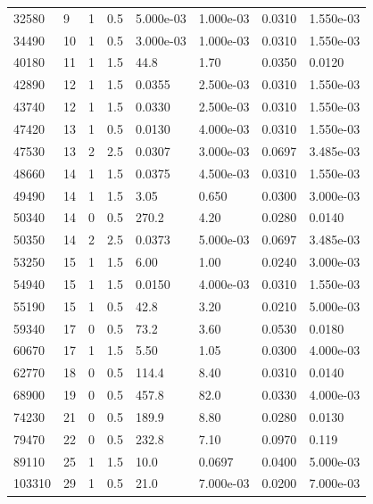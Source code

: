 \documentclass[preview]{standalone}
\begin{document}
{{\begin{tabular}{L{1.2cm}C{1.2cm} C{0.3cm}C{0.5cm} C{1.4cm}C{1.4cm} C{1.4cm}C{1.4cm}}
  32580  &     9  & 1     & 0.5 &  5.000e-03  & 1.000e-03  & 0.0310 &  1.550e-03   \\ 
  34490  &    10  & 1     & 0.5 &  3.000e-03  & 1.000e-03  & 0.0310 &  1.550e-03   \\ 
  40180  &    11  & 1     & 1.5 &  44.8  & 1.70  & 0.0350 &  0.0120   \\ 
  42890  &    12  & 1     & 1.5 &  0.0355  & 2.500e-03  & 0.0310 &  1.550e-03   \\ 
  43740  &    12  & 1     & 1.5 &  0.0330  & 2.500e-03  & 0.0310 &  1.550e-03   \\ 
  47420  &    13  & 1     & 0.5 &  0.0130  & 4.000e-03  & 0.0310 &  1.550e-03   \\ 
  47530  &    13  & 2     & 2.5 &  0.0307  & 3.000e-03  & 0.0697 &  3.485e-03   \\ 
  48660  &    14  & 1     & 1.5 &  0.0375  & 4.500e-03  & 0.0310 &  1.550e-03   \\ 
  49490  &    14  & 1     & 1.5 &  3.05  & 0.650  & 0.0300 &  3.000e-03   \\ 
  50340  &    14  & 0     & 0.5 &  270.2  & 4.20  & 0.0280 &  0.0140   \\ 
  50350  &    14  & 2     & 2.5 &  0.0373  & 5.000e-03  & 0.0697 &  3.485e-03   \\ 
  53250  &    15  & 1     & 1.5 &  6.00  & 1.00  & 0.0240 &  3.000e-03   \\ 
  54940  &    15  & 1     & 1.5 &  0.0150  & 4.000e-03  & 0.0310 &  1.550e-03   \\ 
  55190  &    15  & 1     & 0.5 &  42.8  & 3.20  & 0.0210 &  5.000e-03   \\ 
  59340  &    17  & 0     & 0.5 &  73.2  & 3.60  & 0.0530 &  0.0180   \\ 
  60670  &    17  & 1     & 1.5 &  5.50  & 1.05  & 0.0300 &  4.000e-03   \\ 
  62770  &    18  & 0     & 0.5 &  114.4  & 8.40  & 0.0310 &  0.0140   \\ 
  68900  &    19  & 0     & 0.5 &  457.8  & 82.0  & 0.0330 &  4.000e-03   \\ 
  74230  &    21  & 0     & 0.5 &  189.9  & 8.80  & 0.0280 &  0.0130   \\ 
  79470  &    22  & 0     & 0.5 &  232.8  & 7.10  & 0.0970 &  0.119   \\ 
  89110  &    25  & 1     & 1.5 &  10.0  & 0.0697  & 0.0400 &  5.000e-03   \\ 
  103310  &    29  & 1     & 0.5 &  21.0  & 7.000e-03  & 0.0200 &  7.000e-03   \\ 

\end{tabular}}}
\end{document}
